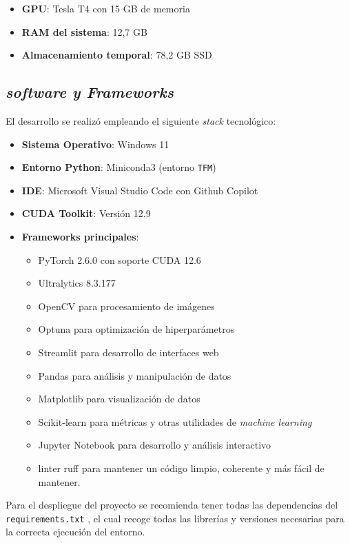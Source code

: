 \documentclass[12pt,a4paper,onecolumn,oneside]{report}
\begin{document}
\begin{itemize}
    \item \textbf{GPU}: Tesla T4 con 15 GB de memoria
    \item \textbf{RAM del sistema}: 12,7 GB
    \item \textbf{Almacenamiento temporal}: 78,2 GB SSD
\end{itemize}

\subsection{\textit{software y Frameworks}}

El desarrollo se realizó empleando el siguiente \textit{stack} tecnológico:

\begin{itemize}
    \item \textbf{Sistema Operativo}: Windows 11
    \item \textbf{Entorno Python}: Miniconda3 (entorno \texttt{TFM})
    \item \textbf{IDE}: Microsoft Visual Studio Code con Github Copilot
    \item \textbf{CUDA Toolkit}: Versión 12.9
    \item \textbf{Frameworks principales}:
    \begin{itemize}
        \item PyTorch 2.6.0 con soporte CUDA 12.6
        \item Ultralytics 8.3.177
        \item OpenCV para procesamiento de imágenes
        \item Optuna para optimización de hiperparámetros 
        \item Streamlit para desarrollo de interfaces web
        \item Pandas para análisis y manipulación de datos
        \item Matplotlib para visualización de datos 
        \item Scikit-learn para métricas y otras utilidades de \textit{machine learning}
        \item Jupyter Notebook para desarrollo y análisis interactivo
        \item linter ruff para mantener un código limpio, coherente y más fácil de mantener.
    \end{itemize}
\end{itemize}

Para el despliegue del proyecto se recomienda tener todas las dependencias del \texttt{requirements.txt} \cite{repoTFM}, el cual 
recoge todas las librerías y versiones necesarias para la correcta ejecución del entorno.
\end{document}
